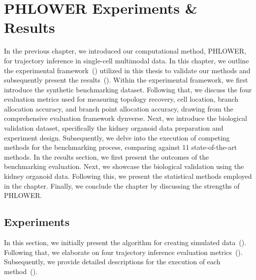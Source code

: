 \chapter{PHLOWER Experiments \& Results}
\label{chapter:PHLOWER_bench}
\graphicspath{{chapter6/figs}}

In the previous chapter, we introduced our computational method, PHLOWER, for trajectory inference in single-cell multimodal data. In this chapter, we outline the experimental framework~() utilized in this thesis to validate our methods and subsequently present the results~(). Within the experimental framework, we first introduce the synthetic benchmarking dataset. Following that, we discuss the four evaluation metrics used for measuring topology recovery, cell location, branch allocation accuracy, and branch point allocation accuracy, drawing from the comprehensive evaluation framework dynverse. Next, we introduce the biological validation dataset, specifically the kidney organoid data preparation and experiment design. Subsequently, we delve into the execution of competing methods for the benchmarking process, comparing against 11 state-of-the-art methods. In the results section, we first present the outcomes of the benchmarking evaluation. Next, we showcase the biological validation using the kidney organoid data. Following this, we present the statistical methods employed in the chapter. Finally, we conclude the chapter by discussing the strengths of PHLOWER.

\section{Experiments}
\label{chapter:PHLOWER_bench:exp}
In this section, we initially present the algorithm for creating simulated data~(). Following that, we elaborate on four trajectory inference evaluation metrics~(). Subsequently, we provide detailed descriptions for the execution of each method~().


